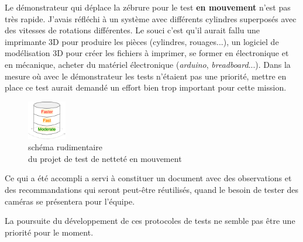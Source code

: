 Le démonstrateur qui déplace la zébrure pour le test \textbf{en mouvement} n'est pas très rapide. J'avais réfléchi  à un système avec différents cylindres superposés avec des vitesses de rotations différentes. Le souci c'est qu'il aurait fallu une imprimante 3D pour produire les pièces (cylindres, rouages...), un logiciel de modélisation 3D pour créer les fichiers à imprimer, se former en électronique et en mécanique, acheter du matériel électronique (\textit{arduino}, \textit{breadboard}...). Dans la mesure où avec le démonstrateur les tests n'étaient pas une priorité, mettre en place ce test aurait demandé un effort bien trop important pour cette mission.
\begin{figure}[H]
    \includegraphics[width=0.15\textwidth]{img/vit_cyl.png}
    \centering
    \caption{schéma rudimentaire\\du projet de test de netteté en mouvement}
    \end{figure}
  Ce qui a été accompli a servi à constituer un document avec des observations et des recommandations qui seront peut-être réutilisés, quand le besoin de tester des caméras se présentera pour l'équipe.
  
  La poursuite du développement de ces protocoles de tests ne semble pas être une priorité pour le moment.